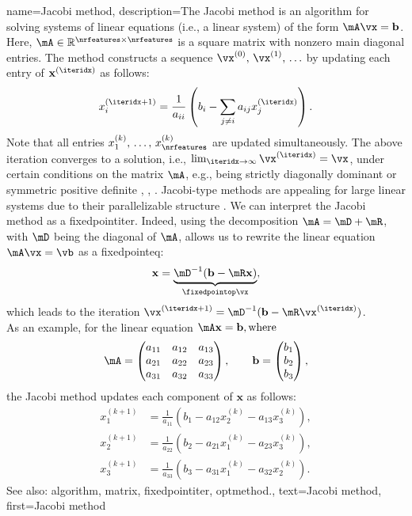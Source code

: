 {name={Jacobi method},
	description={The Jacobi method is an \gls{algorithm}  
		for solving systems of linear equations (i.e., a linear system) of the form $\mA\vx= \mathbf{b}$.  
		Here, $\mA \in \mathbb{R}^{\nrfeatures \times \nrfeatures}$ is a square \gls{matrix} with 
		nonzero main diagonal entries. The method constructs a \gls{sequence} $\vx^{(0)}, \,\vx^{(1)}, \,\ldots$ 
		by updating each entry of $\mathbf{x}^{(\iteridx)}$ as follows:
		\[
		x_i^{(\iteridx+1)} = \frac{1}{a_{ii}} \left( b_i - \sum_{j \neq i} a_{ij} x_j^{(\iteridx)} \right).
		\]
		Note that all entries $x^{(k)}_{1}, \,\ldots, \,x^{(k)}_{\nrfeatures}$ are updated simultaneously.
		The above \gls{iteration} converges to a solution, i.e., $\lim_{\iteridx \rightarrow \infty} \vx^{(\iteridx)}=\vx$, 
		under certain conditions on the \gls{matrix} $\mA$, e.g., being strictly 
		diagonally dominant or symmetric positive  definite \cite{GolubVanLoanBook}, \cite{StrangLinAlg2016}, \cite{Horn91}. 
		Jacobi-type methods are appealing for large linear systems due to their parallelizable structure \cite{ParallelDistrBook}.
		We can interpret the Jacobi method as a \gls{fixedpointiter}. Indeed, using the decomposition $\mA = \mD + \mR$, with $\mD$ being the 
		diagonal of $\mA$, allows us to rewrite the linear equation $\mA \vx = \vb$ as a \gls{fixedpointeq}: 
		\[
		\mathbf{x} = \underbrace{\mD^{-1}(\mathbf{b} - \mR \mathbf{x})}_{\fixedpointop \vx},
		\]
		which leads to the \gls{iteration} $\vx^{(\iteridx+1)} = \mD^{-1}(\mathbf{b} - \mR \vx^{(\iteridx)})$.
		\\
		As an example, for the linear equation $\mA \mathbf{x} = \mathbf{b}, \text{where}$
		 \[
		 \mA = \begin{pmatrix}
		 	a_{11} & a_{12} & a_{13} \\
		 	a_{21} & a_{22} & a_{23} \\
		 	a_{31} & a_{32} & a_{33}
		 \end{pmatrix}, \qquad
		 \mathbf{b} = \begin{pmatrix}
		 	b_1 \\
		 	b_2 \\
		 	b_3
		 \end{pmatrix},
		 \]
		 the Jacobi method updates each component of \( \mathbf{x} \) as follows:
		 \[
		 \begin{aligned}
		 	x_1^{(k+1)} &= \frac{1}{a_{11}} \left( b_1 - a_{12} x_2^{(k)} - a_{13} x_3^{(k)} \right), \\
		 	x_2^{(k+1)} &= \frac{1}{a_{22}} \left( b_2 - a_{21} x_1^{(k)} - a_{23} x_3^{(k)} \right), \\
		 	x_3^{(k+1)} &= \frac{1}{a_{33}} \left( b_3 - a_{31} x_1^{(k)} - a_{32} x_2^{(k)} \right).
		 \end{aligned}
		 \]
		See also: \gls{algorithm}, \gls{matrix}, \gls{fixedpointiter}, \gls{optmethod}.},
	text={Jacobi method}, 
	first={Jacobi method}
}


